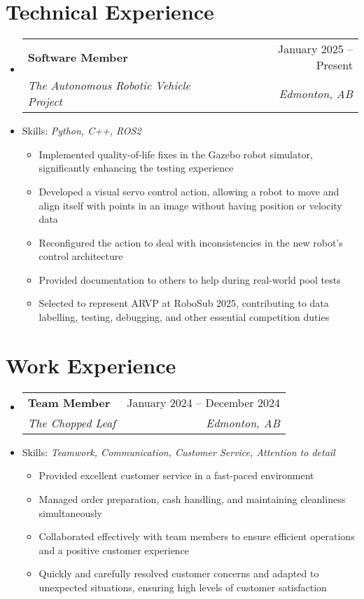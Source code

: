 \documentclass[letterpaper,11pt]{article}
\makeatletter
\newcommand{\resumeItem}[1]{
  \item\small{
    {#1 \vspace{-2pt}}
  }
}
\newcommand{\resumeSubheading}[4]{
  \vspace{-2pt}\item
    \begin{tabular*}{0.97\textwidth}[t]{l@{\extracolsep{\fill}}r}
      \textbf{#1} & #2 \\
      \textit{\small#3} & \textit{\small #4} \\
    \end{tabular*}\vspace{-7pt}
}
\newcommand{\resumeSubSubheading}[2]{
    \item
    \begin{tabular*}{0.97\textwidth}{l@{\extracolsep{\fill}}r}
      \textit{\small#1} & \textit{\small #2} \\
    \end{tabular*}\vspace{-7pt}
}
\newcommand{\resumeSubItem}[1]{\resumeItem{#1}\vspace{-4pt}}
\newcommand{\resumeSubHeadingListStart}{\begin{itemize}[leftmargin=0.15in, label={}]}
\newcommand{\resumeSubHeadingListEnd}{\end{itemize}}
\newcommand{\resumeItemListStart}{\begin{itemize}}
\newcommand{\resumeItemListEnd}{\end{itemize}\vspace{-5pt}}
\makeatother
\begin{document}
\section{Technical Experience}	
  \resumeSubHeadingListStart
    \resumeSubheading
      {Software Member}{January 2025 -- Present}
      {The Autonomous Robotic Vehicle Project}{Edmonton, AB}
     \resumeSubItem{Skills: \emph{Python, C++, ROS2}}
      \resumeItemListStart
        \resumeItem{Implemented quality-of-life fixes in the Gazebo robot simulator, significantly enhancing the testing experience}
        \resumeItem{Developed a visual servo control action, allowing a robot to move and align itself with points in an image without having position or velocity data}
        \resumeItem{Reconfigured the action to deal with inconsistencies in the new robot's control architecture}
        \resumeItem{Provided documentation to others to help during real-world pool tests}
        \resumeItem{Selected to represent ARVP at RoboSub 2025, contributing to data labelling, testing, debugging, and other essential competition duties}
      \resumeItemListEnd

  \resumeSubHeadingListEnd
  
\section{Work Experience}
  \resumeSubHeadingListStart

    \resumeSubheading
      {Team Member}{January 2024 -- December 2024}
      {The Chopped Leaf}{Edmonton, AB}
      \resumeSubItem{Skills: \emph{Teamwork, Communication, Customer Service, Attention to detail}}
      \resumeItemListStart
        \resumeItem{Provided excellent customer service in a fast-paced environment}
        \resumeItem{Managed order preparation, cash handling, and maintaining cleanliness simultaneously}
        \resumeItem{Collaborated effectively with team members to ensure efficient operations and a positive customer experience}
        \resumeItem{Quickly and carefully resolved customer concerns and adapted to unexpected situations, ensuring high levels of customer satisfaction}
      \resumeItemListEnd
      

  \resumeSubHeadingListEnd

\end{document}
